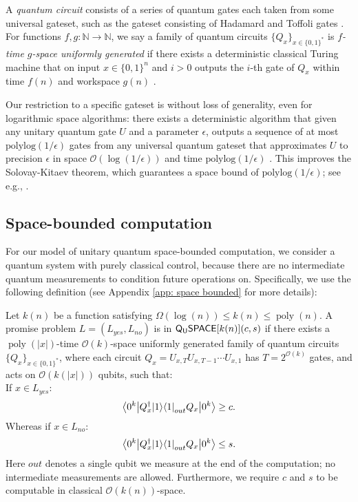 \documentclass[a4paper,UKenglish]{lipics-v2016}
\newcommand\QSPACE{{\sf{Q_{U}SPACE}}}
\newcommand\bigoh{\mathcal{O}}
\newcommand{\polylog}{\textrm{polylog}}
\DeclareMathOperator{\poly}{poly}
\begin{document}
A \emph{quantum circuit} consists of a series of quantum gates each taken from some universal gateset, such as the gateset consisting of Hadamard and Toffoli gates \cite{shi}. 
 For functions $f,g:\mathbb{N}\rightarrow\mathbb{N}$, we say a family of quantum circuits $\{Q_x\}_{x\in\{0,1\}^*}$ is \emph{$f$-time $g$-space uniformly generated} if there exists a deterministic classical Turing machine that on input $x\in\{0,1\}^n$ and $i>0$ outputs the $i$-th gate of $Q_x$ within time $f(n)$ and workspace $g(n)$ \cite{nc00}.  
 
Our restriction to a specific gateset is without loss of generality, even for logarithmic space algorithms:  there exists a deterministic algorithm that given any unitary quantum gate $U$ and a parameter $\epsilon$, outputs a sequence of at most $\polylog({1/\epsilon})$ gates from any universal quantum gateset that approximates $U$ to precision $\epsilon$ in space $\bigoh({\log({1/\epsilon})})$ and time $\polylog({1/\epsilon})$ \cite{mw12}.  This improves the Solovay-Kitaev theorem, which guarantees a space bound of $\polylog(1/\epsilon)$; see e.g., \cite{nc00}.
\subsection{Space-bounded computation} \label{sec: space bounded computation}
For our model of unitary quantum space-bounded computation, we consider a quantum system with purely classical control, because there are no intermediate quantum measurements to condition future operations on. Specifically, we use the following definition (see Appendix \ref{app: space bounded} for more details):

\begin{definition} \label{def: qspace}
Let $k(n)$ be a function satisfying $\Omega(\log(n)) \le k(n) \le \poly(n)$. A promise problem $L=(L_{yes},L_{no})$ is in $\QSPACE[k(n)](c,s)$ if there exists a $\poly(|x|)$-time $\mathcal{O}(k)$-space uniformly generated family of quantum circuits $\{Q_x\}_{x\in\{0,1\}^*}$, where each circuit $Q_x=U_{x,T}U_{x,T-1}\cdots U_{x,1}$ has $T=2^{\mathcal{O}(k)}$ gates, and acts on $\mathcal{O}(k(|x|))$ qubits, such that:\\
 If $x \in L_{yes}$:
\begin{equation}
{\left\langle{0^k}\right\vert} Q^\dagger_x {\left\vert{1}\right\rangle}{\left\langle{1}\right\vert}_{out} Q_x {\left\vert{0^k}\right\rangle} \ge c.
\end{equation}
Whereas if $x \in L_{no}$:
\begin{equation}
{\left\langle{0^k}\right\vert} Q^\dagger_x {\left\vert{1}\right\rangle}{\left\langle{1}\right\vert}_{out} Q_x {\left\vert{0^k}\right\rangle} \le s.
\end{equation}
Here $out$ denotes a single qubit we measure at the end of the computation; no intermediate measurements are allowed.  
Furthermore, we require $c$ and $s$ to be computable in classical $\bigoh(k(n))$-space.
\end{definition}
\end{document}
